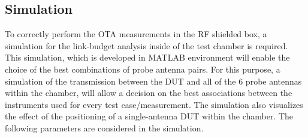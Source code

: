 \subsection{Simulation} 
To correctly perform the \acs{OTA} measurements in the \acs{RF} shielded box, a simulation for the link-budget analysis inside of the test chamber is required. This simulation, which is developed in MATLAB\textregistered{} environment will enable the choice of the best combinations of probe antenna pairs. For this purpose, a simulation of the transmission between the \acs{DUT} and all of the 6 probe antennas within the chamber, will allow a decision on the best associations between the instruments used for every test case/measurement. The simulation also visualizes the effect of the positioning of a single-antenna \acs{DUT} within the chamber. The following parameters are considered in the simulation.
